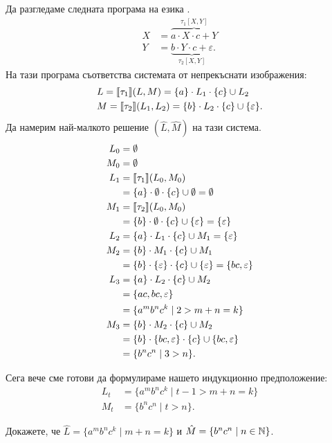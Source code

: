\begin{example}
  Да разгледаме следната програма на езика \CFG.
  \begin{align*}
    X & = \overbrace{a\cdot X \cdot c + Y}^{\tau_1[X,Y]}\\
    Y & = \underbrace{b \cdot Y \cdot c + \varepsilon}_{\tau_2[X,Y]}.
  \end{align*}
  На тази програма съответства системата от непрекъснати изображения:
  \begin{align*}
    & L = \llbracket{\tau_1}\rrbracket(L,M) = \{a\}\cdot L_1 \cdot \{c\} \cup L_2\\
    & M = \llbracket{\tau_2}\rrbracket(L_1,L_2) = \{b\} \cdot L_2 \cdot \{c\} \cup \{\varepsilon\}.
  \end{align*}
  Да намерим най-малкото решение $(\hat{L},\hat{M})$ на тази система.
  \begin{align*}
    L_0 & = \emptyset\\
    M_0 & = \emptyset\\
    L_1 & = \llbracket{\tau_1}\rrbracket(L_0,M_0)\\
        & = \{a\}\cdot \emptyset \cdot \{c\} \cup \emptyset = \emptyset\\
    M_1 & = \llbracket{\tau_2}\rrbracket(L_0,M_0)\\
        & = \{b\} \cdot \emptyset \cdot \{c\} \cup \{\varepsilon\} = \{\varepsilon\}\\
    L_2 & = \{a\}\cdot L_1 \cdot \{c\} \cup M_1 = \{\varepsilon\}\\
    M_2 & = \{b\} \cdot M_1 \cdot \{c\} \cup M_1\\
        & = \{b\} \cdot \{\varepsilon\} \cdot \{c\} \cup \{\varepsilon\} = \{bc,\varepsilon\}\\
    L_3 & = \{a\}\cdot L_2 \cdot \{c\} \cup M_2 \\
        & = \{ac,bc,\varepsilon\}\\
        & = \{a^mb^nc^k \mid 2 > m+n = k\}\\
    M_3 & = \{b\} \cdot M_2 \cdot \{c\} \cup M_2\\
        & = \{b\} \cdot \{bc,\varepsilon\} \cdot \{c\} \cup \{bc,\varepsilon\}\\
        & = \{b^nc^n \mid 3 > n\}.
  \end{align*}

  Сега вече сме готови да формулираме нашето индукционно предположение:
  \begin{align*}
    L_t & = \{a^mb^nc^k \mid t-1 > m+n = k\}\\
    M_t & = \{b^nc^n \mid t > n \}.
  \end{align*}

  Докажете, че $\hat{L} = \{a^mb^nc^k \mid m+n = k\}$ и $\hat{M} = \{b^nc^n \mid n \in \mathbb{N}\}$.
  
\end{example}


